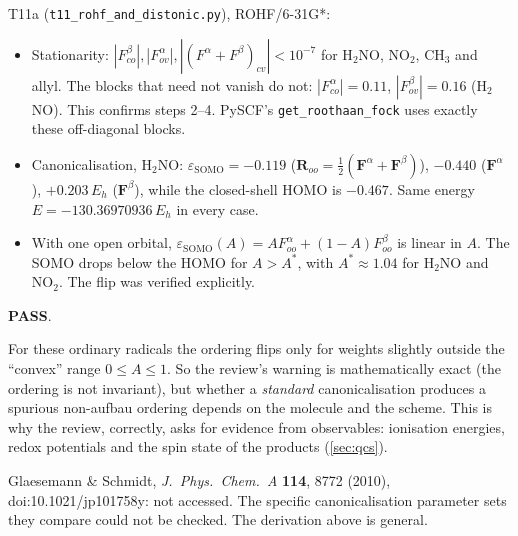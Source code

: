 \begin{verifybox}
T11a (\texttt{t11\_rohf\_and\_distonic.py}), ROHF/6-31G*:
\begin{itemize}
  \item Stationarity: $|F^\beta_{co}|,|F^\alpha_{ov}|,|(F^\alpha+F^\beta)_{cv}|<10^{-7}$ for H$_2$NO, NO$_2$, CH$_3$ and allyl.
        The blocks that need not vanish do not: $|F^\alpha_{co}|=0.11$, $|F^\beta_{ov}|=0.16$ (H$_2$NO). This confirms
        steps 2--4. PySCF's \texttt{get\_roothaan\_fock} uses exactly these off-diagonal blocks.
  \item Canonicalisation, H$_2$NO: $\varepsilon_{\text{SOMO}}=-0.119$ ($\mathbf R_{oo}=\tfrac12(\mathbf F^\alpha+\mathbf F^\beta)$),
        $-0.440$ ($\mathbf F^\alpha$), $+0.203\,E_h$ ($\mathbf F^\beta$), while the closed-shell HOMO is $-0.467$. Same energy
        $E=-130.36970936\,E_h$ in every case.
  \item With one open orbital, $\varepsilon_{\text{SOMO}}(A)=AF^\alpha_{oo}+(1-A)F^\beta_{oo}$ is linear in $A$. The SOMO drops
        below the HOMO for $A>A^*$, with $A^*\approx1.04$ for H$_2$NO and NO$_2$. The flip was verified explicitly.
\end{itemize}
\textbf{PASS}.
\end{verifybox}
\begin{caveatbox}
For these ordinary radicals the ordering flips only for weights slightly outside the ``convex'' range
$0\le A\le1$. So the review's warning is mathematically exact (the ordering is not invariant), but whether
a \emph{standard} canonicalisation produces a spurious non-aufbau ordering depends on the molecule and
the scheme. This is why the review, correctly, asks for evidence from observables: ionisation
energies, redox potentials and the spin state of the products (\cref{sec:qcs}).
\end{caveatbox}
\begin{sourcebox}
Glaesemann \& Schmidt, \emph{J.\ Phys.\ Chem.\ A} \textbf{114}, 8772 (2010), doi:10.1021/jp101758y: not accessed.
The specific canonicalisation parameter sets they compare could not be checked. The derivation above
is general.
\end{sourcebox}

